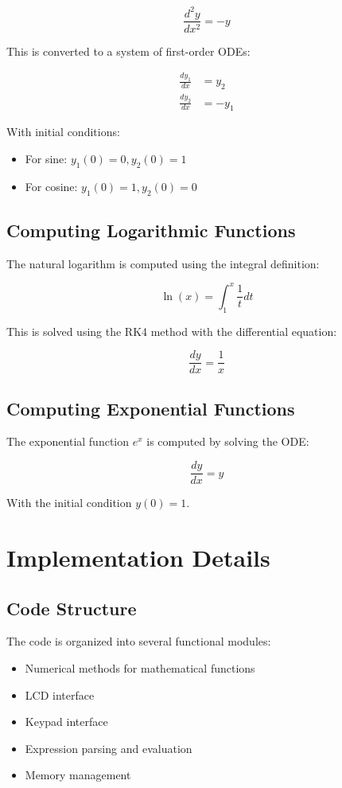 \documentclass[12pt,a4paper]{article}
\begin{document}
\begin{equation}
\frac{d^2y}{dx^2} = -y
\end{equation}

This is converted to a system of first-order ODEs:

\begin{align}
\frac{dy_1}{dx} &= y_2 \\
\frac{dy_2}{dx} &= -y_1
\end{align}

With initial conditions:
\begin{itemize}
    \item For sine: $y_1(0) = 0, y_2(0) = 1$
    \item For cosine: $y_1(0) = 1, y_2(0) = 0$
\end{itemize}

\subsection{Computing Logarithmic Functions}
The natural logarithm is computed using the integral definition:

\begin{equation}
\ln(x) = \int_{1}^{x} \frac{1}{t} dt
\end{equation}

This is solved using the RK4 method with the differential equation:

\begin{equation}
\frac{dy}{dx} = \frac{1}{x}
\end{equation}

\subsection{Computing Exponential Functions}
The exponential function $e^x$ is computed by solving the ODE:

\begin{equation}
\frac{dy}{dx} = y
\end{equation}

With the initial condition $y(0) = 1$.

\section{Implementation Details}

\subsection{Code Structure}
The code is organized into several functional modules:
\begin{itemize}
    \item Numerical methods for mathematical functions
    \item LCD interface
    \item Keypad interface
    \item Expression parsing and evaluation
    \item Memory management
\end{itemize}
\end{document}
